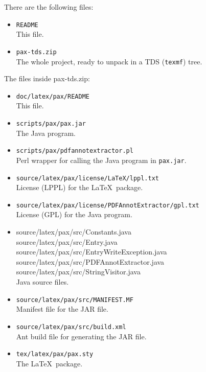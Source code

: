 \documentclass[pagesize=auto, parskip=half, fontsize=12pt, DIV=13]{scrartcl}
\begin{document}
There are the following files:
%
\begin{itemize}
\item
  \texttt{README} \\
  \null\quad This file.
\item
  \texttt{pax-tds.zip} \\
  \null\quad The whole project, ready to unpack in a TDS (\texttt{texmf}) tree.
\end{itemize}

The files inside pax-tds.zip:
%
\begin{itemize}
\item
  \texttt{doc/latex/pax/README} \\
  \null\quad This file.
\item
  \texttt{scripts/pax/pax.jar} \\
  \null\quad The Java program.
\item
  \texttt{scripts/pax/pdfannotextractor.pl} \\
  \null\quad Perl wrapper for calling the Java program in \texttt{pax.jar}.
\item
  \texttt{source/latex/pax/license/LaTeX/lppl.txt} \\
  \null\quad License (LPPL) for the \LaTeX\ package.
\item
  \texttt{source/latex/pax/license/PDFAnnotExtractor/gpl.txt} \\
  \null\quad License (GPL) for the Java program.
\item
  \begingroup
  \ttfamily
  source/latex/pax/src/Constants.java \\
  source/latex/pax/src/Entry.java \\
  source/latex/pax/src/EntryWriteException.java \\
  source/latex/pax/src/PDFAnnotExtractor.java \\
  source/latex/pax/src/StringVisitor.java
  \endgroup \\
  \null\quad Java source files.
\item
  \texttt{source/latex/pax/src/MANIFEST.MF} \\
  \null\quad Manifest file for the JAR file.
\item
  \texttt{source/latex/pax/src/build.xml} \\
  \null\quad Ant build file for generating the JAR file.
\item
  \texttt{tex/latex/pax/pax.sty} \\
  \null\quad The \LaTeX\ package.
\end{itemize}
\end{document}
